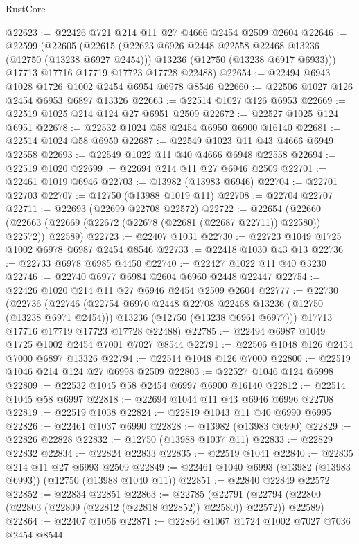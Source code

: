 \begin{lexlean}{RustCore}
\begin{coremodule}
@22623 := @22426 @721 @214 @11 @27 @4666 @2454 @2509 @2604
@22646 := @22599
    (@22605
      (@22615
        (@22623 @6926 @2448 @22558 @22468 @13236 (@12750 (@13238 @6927 @2454)))
        @13236
        (@12750 (@13238 @6917 @6933)))
      @17713
      @17716
      @17719
      @17723
      @17728
      @22488)
@22654 := @22494 @6943 @1028 @1726 @1002 @2454 @6954 @6978 @8546
@22660 := @22506 @1027 @126 @2454 @6953 @6897 @13326
@22663 := @22514 @1027 @126 @6953
@22669 := @22519 @1025 @214 @124 @27 @6951 @2509
@22672 := @22527 @1025 @124 @6951
@22678 := @22532 @1024 @58 @2454 @6950 @6900 @16140
@22681 := @22514 @1024 @58 @6950
@22687 := @22549 @1023 @11 @43 @4666 @6949 @22558
@22693 := @22549 @1022 @11 @40 @4666 @6948 @22558
@22694 := @22519 @1020
@22699 := @22694 @214 @11 @27 @6946 @2509
@22701 := @22461 @1019 @6946
@22703 := @13982 (@13983 @6946)
@22704 := @22701 @22703
@22707 := @12750 (@13988 @1019 @11)
@22708 := @22704 @22707
@22711 := @22693 (@22699 @22708 @22572)
@22722 := @22654
    (@22660 (@22663 (@22669 (@22672 (@22678 (@22681 (@22687 @22711)) @22580)) @22572)) @22589)
@22723 := @22407 @1031
@22730 := @22723 @1049 @1725 @1002 @6978 @6987 @2454 @8546
@22733 := @22418 @1030 @43 @13
@22736 := @22733 @6978 @6985 @4450
@22740 := @22427 @1022 @11 @40 @3230
@22746 := @22740 @6977 @6984 @2604 @6960 @2448 @22447
@22754 := @22426 @1020 @214 @11 @27 @6946 @2454 @2509 @2604
@22777 := @22730
    (@22736
      (@22746
        (@22754 @6970 @2448 @22708 @22468 @13236 (@12750 (@13238 @6971 @2454)))
        @13236
        (@12750 (@13238 @6961 @6977)))
      @17713
      @17716
      @17719
      @17723
      @17728
      @22488)
@22785 := @22494 @6987 @1049 @1725 @1002 @2454 @7001 @7027 @8544
@22791 := @22506 @1048 @126 @2454 @7000 @6897 @13326
@22794 := @22514 @1048 @126 @7000
@22800 := @22519 @1046 @214 @124 @27 @6998 @2509
@22803 := @22527 @1046 @124 @6998
@22809 := @22532 @1045 @58 @2454 @6997 @6900 @16140
@22812 := @22514 @1045 @58 @6997
@22818 := @22694 @1044 @11 @43 @6946 @6996 @22708
@22819 := @22519 @1038
@22824 := @22819 @1043 @11 @40 @6990 @6995
@22826 := @22461 @1037 @6990
@22828 := @13982 (@13983 @6990)
@22829 := @22826 @22828
@22832 := @12750 (@13988 @1037 @11)
@22833 := @22829 @22832
@22834 := @22824 @22833
@22835 := @22519 @1041
@22840 := @22835 @214 @11 @27 @6993 @2509
@22849 := @22461 @1040 @6993 (@13982 (@13983 @6993)) (@12750 (@13988 @1040 @11))
@22851 := @22840 @22849 @22572
@22852 := @22834 @22851
@22863 := @22785
    (@22791 (@22794 (@22800 (@22803 (@22809 (@22812 (@22818 @22852)) @22580)) @22572)) @22589)
@22864 := @22407 @1056
@22871 := @22864 @1067 @1724 @1002 @7027 @7036 @2454 @8544

\end{coremodule}
\end{lexlean}
